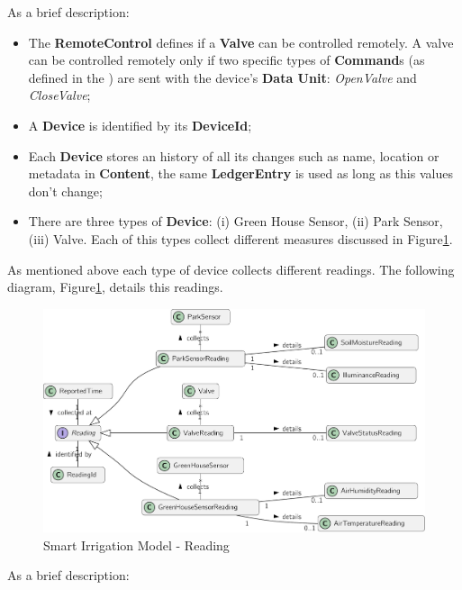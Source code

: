 As a brief description:

\begin{itemize}
   \item The \textbf{RemoteControl} defines if a \textbf{Valve} can be controlled remotely. A valve can be controlled remotely only if two specific types of \textbf{Command}s (as defined in the ) are sent with the device's \textbf{Data Unit}: \textit{OpenValve} and \textit{CloseValve};
   \item A \textbf{Device} is identified by its \textbf{DeviceId};
   \item Each \textbf{Device} stores an history of all its changes such as name, location or metadata in \textbf{Content}, the same \textbf{LedgerEntry} is used as long as this values don't change;
   \item There are three types of \textbf{Device}: (i) Green House Sensor, (ii) Park Sensor, (iii) Valve. Each of this types collect different measures discussed in Figure\ref{fig:design:domain:bounded_contexts:irrigation:diagram:reading}.
\end{itemize}

As mentioned above each type of device collects different readings. The following diagram, Figure\ref{fig:design:domain:bounded_contexts:irrigation:diagram:reading}, details this readings.

\begin{figure}[H]
  \centering
  \includegraphics[page=1,width=\columnwidth]{assets/diagrams/design/domain/smart-irrigation-model-4.pdf}
  \caption[Smart Irrigation Model - Reading]{Smart Irrigation Model - Reading}
  \label{fig:design:domain:bounded_contexts:irrigation:diagram:reading}
\end{figure}

As a brief description:

